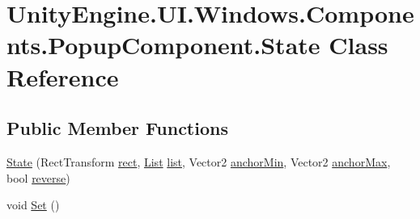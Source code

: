 \hypertarget{class_unity_engine_1_1_u_i_1_1_windows_1_1_components_1_1_popup_component_1_1_state}{}\section{Unity\+Engine.\+U\+I.\+Windows.\+Components.\+Popup\+Component.\+State Class Reference}
\label{class_unity_engine_1_1_u_i_1_1_windows_1_1_components_1_1_popup_component_1_1_state}
\subsection*{Public Member Functions}
\begin{DoxyCompactItemize}
\item 
\hyperlink{class_unity_engine_1_1_u_i_1_1_windows_1_1_components_1_1_popup_component_1_1_state_aaca310566e470c2aa8ebd8892c62539d}{State} (Rect\+Transform \hyperlink{class_unity_engine_1_1_u_i_1_1_windows_1_1_components_1_1_popup_component_1_1_state_ae4c102dfc5ff08b49b9952cfb71754a2}{rect}, \hyperlink{class_unity_engine_1_1_u_i_1_1_windows_1_1_components_1_1_list}{List} \hyperlink{class_unity_engine_1_1_u_i_1_1_windows_1_1_components_1_1_popup_component_1_1_state_a22106fe9140162c4797486e597f839ca}{list}, Vector2 \hyperlink{class_unity_engine_1_1_u_i_1_1_windows_1_1_components_1_1_popup_component_1_1_state_a6643c883830739148a721bc1d2eaaee5}{anchor\+Min}, Vector2 \hyperlink{class_unity_engine_1_1_u_i_1_1_windows_1_1_components_1_1_popup_component_1_1_state_ab854c06e92c1619130d5ae0ee0f9d89e}{anchor\+Max}, bool \hyperlink{class_unity_engine_1_1_u_i_1_1_windows_1_1_components_1_1_popup_component_1_1_state_a0bc1cd458984d40a301106bcd400205f}{reverse})
\item 
void \hyperlink{class_unity_engine_1_1_u_i_1_1_windows_1_1_components_1_1_popup_component_1_1_state_aade70c171bb417da7d08c74121abf7e7}{Set} ()
\end{DoxyCompactItemize}
